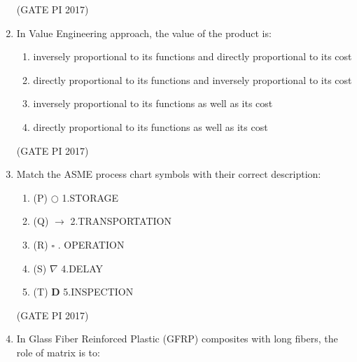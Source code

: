 \documentclass[journal,12pt,onecolumn]{IEEEtran}
\theoremstyle{remark}
\begin{document}
\begin{enumerate}
\hfill (GATE PI 2017)

\item In Value Engineering approach, the value of the product is:
\begin{enumerate}
\item inversely proportional to its functions and directly proportional to its cost
\item directly proportional to its functions and inversely proportional to its cost
\item inversely proportional to its functions as well as its cost
\item directly proportional to its functions as well as its cost
\end{enumerate}
\hfill (GATE PI 2017)

\item Match the ASME process chart symbols with their correct description: \\

\begin{enumerate}

    \item[] (P) $\bigcirc$  \quad 1.STORAGE\\
    \item[] (Q) $\longrightarrow$ \quad 2.TRANSPORTATION\\
    \item[] (R) $\square$ . OPERATION \\
    \item[] (S) $\nabla$ \quad 4.DELAY \\
    \item[] (T) \textbf{D}  \quad 5.INSPECTION \\
\end{enumerate}


\begin{enumerate}
\end{enumerate}
\hfill (GATE PI 2017)

\item In Glass Fiber Reinforced Plastic (GFRP) composites with long fibers, the role of matrix is to:  


\end{enumerate}
\end{document}

